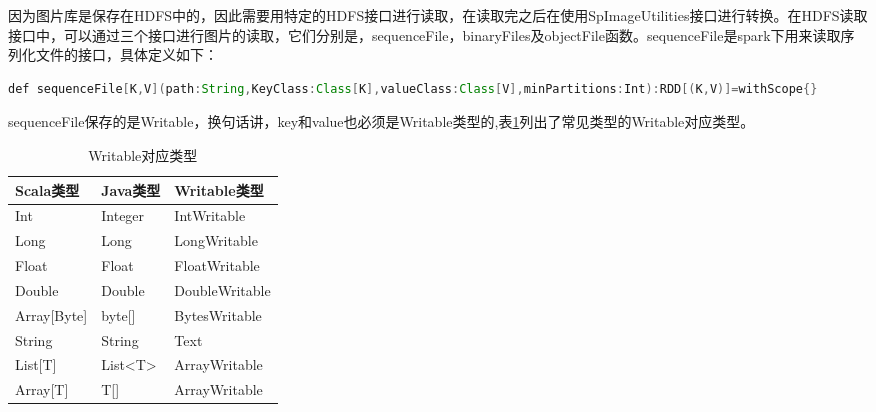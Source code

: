 因为图片库是保存在HDFS中的，因此需要用特定的HDFS接口进行读取，在读取完之后在使用SpImageUtilities接口进行转换。在HDFS读取接口中，可以通过三个接口进行图片的读取，它们分别是，sequenceFile，binaryFiles及objectFile函数。sequenceFile是spark下用来读取序列化文件的接口，具体定义如下：
\begin{lstlisting}[language=Java,numbers=none,frame=none]
def sequenceFile[K,V](path:String,KeyClass:Class[K],valueClass:Class[V],minPartitions:Int):RDD[(K,V)]=withScope{}
\end{lstlisting}
sequenceFile保存的是Writable，换句话讲，key和value也必须是Writable类型的,表\ref{tab:Writable}列出了常见类型的Writable对应类型。
\begin{table}[h] %
\caption{Writable对应类型} %
\centering
\label{tab:Writable}
\begin{tabular}{p{4cm}|p{2cm}|p{6cm}} %
\hline
\hline
Scala类型  & Java类型 & Writable类型 \\ %
\hline %
Int  & Integer & IntWritable\\
\hline
Long  & Long & LongWritable\\
\hline
Float  & Float & FloatWritable\\
\hline
Double  & Double & DoubleWritable\\
\hline
Array[Byte]  & byte[] & BytesWritable\\
\hline
String  & String & Text\\
\hline
List[T] & List<T> & ArrayWritable\\
\hline
Array[T] & T[] & ArrayWritable\\
\hline
\hline
\end{tabular}
\end{table}

